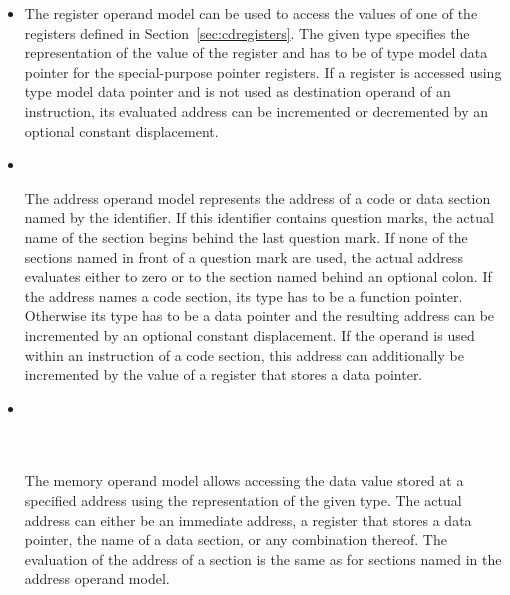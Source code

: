 \begin{itemize}
\item{}\alignright{}\nopagebreak

The register operand model can be used to access the values of one of the registers defined in Section~\ref{sec:cdregisters}.
The given type specifies the representation of the value of the register and has to be of type model data pointer for the special-purpose pointer registers.
If a register is accessed using type model data pointer and is not used as destination operand of an instruction,
its evaluated address can be incremented or decremented by an optional constant displacement.

\item{}\alignright{}\\
\alignright{}\nopagebreak

The address operand model represents the address of a code or data section named by the identifier.
If this identifier contains question marks, the actual name of the section begins behind the last question mark.
If none of the sections named in front of a question mark are used, the actual address evaluates either to zero or to the section named behind an optional colon.
If the address names a code section, its type has to be a function pointer.
Otherwise its type has to be a data pointer and the resulting address can be incremented by an optional constant displacement.
If the operand is used within an instruction of a code section, this address can additionally be incremented by the value of a register that stores a data pointer.

\item{}\alignright{}\\
\alignright{}\\
\alignright{}\\
\alignright{}\nopagebreak

The memory operand model allows accessing the data value stored at a specified address using the representation of the given type.
The actual address can either be an immediate address, a register that stores a data pointer, the name of a data section, or any combination thereof.
The evaluation of the address of a section is the same as for sections named in the address operand model.

\end{itemize}

